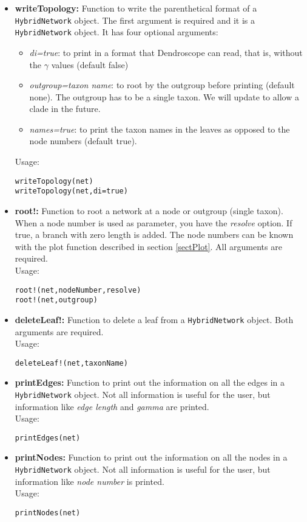 \documentclass[12pt]{article}
\begin{document}
\begin{itemize}
\item \textbf{writeTopology:} Function to write the parenthetical
  format of a \texttt{HybridNetwork} object. The first argument is
  required and it is a \texttt{HybridNetwork} object. It has four optional arguments:
\begin{itemize}
\item{\textit{di=true}: to print in a format that Dendroscope can
    read, that is, without the $\gamma$ values (default
  false)}
\item{\textit{outgroup=taxon name}: to root by the outgroup before
    printing (default none). The outgroup has to be a single taxon. We will update to
  allow a clade in the future.}
\item{\textit{names=true}: to print the taxon names in the leaves as opposed to
  the node numbers (default true).}
\end{itemize}
Usage:
\begin{lstlisting}
writeTopology(net)
writeTopology(net,di=true)
\end{lstlisting}

\item \textbf{root!:} Function to root a network at a node or outgroup
  (single taxon). When a node number is used as parameter, you have
  the \textit{resolve} option. If true, a branch with zero length is
  added. The node numbers can be known with the plot function
  described in section \ref{sectPlot}. All arguments are required.\\
Usage:
\begin{lstlisting}
root!(net,nodeNumber,resolve)
root!(net,outgroup)
\end{lstlisting}

\item \textbf{deleteLeaf!:} Function to delete a leaf from a
  \texttt{HybridNetwork} object. Both arguments are required.\\
Usage:
\begin{lstlisting}
deleteLeaf!(net,taxonName)
\end{lstlisting}


\item \textbf{printEdges:} Function to print out the information on
  all the edges in a
  \texttt{HybridNetwork} object. Not all information is useful for the
  user, but information like \textit{edge length} and \textit{gamma}
  are printed.\\
Usage:
\begin{lstlisting}
printEdges(net)
\end{lstlisting}


\item \textbf{printNodes:} Function to print out the information on
  all the nodes in a
  \texttt{HybridNetwork} object. Not all information is useful for the
  user, but information like \textit{node number}
  is printed.\\
Usage:
\begin{lstlisting}
printNodes(net)
\end{lstlisting}

\end{itemize}
\end{document}

